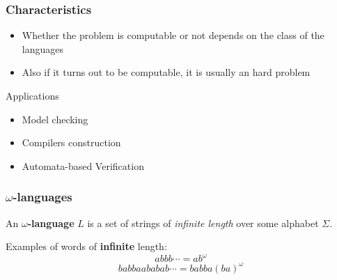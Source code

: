 \documentclass{beamer}
\begin{document}
\begin{frame}
\frametitle{Characteristics}

\begin{itemize}
\item Whether the problem is computable or not depends on the class of the languages
\item Also if it turns out to be computable, it is usually an hard problem
\end{itemize}

Applications
\begin{itemize}
\item Model checking
\item Compilers construction
\item Automata-based Verification
\end{itemize}
\end{frame}

\begin{frame}
\frametitle{$\omega$-languages}
\begin{definition}
An \textbf{$\omega$-language} $L$ is a set of strings of \emph{infinite length} over some
alphabet $\Sigma$.
\end{definition}

Examples of words of \textbf{infinite} length:
\[ abbb\cdots = ab^{\omega} \]
\[ babbaababab\cdots = babba(ba)^{\omega} \]
\end{frame}
\end{document}
